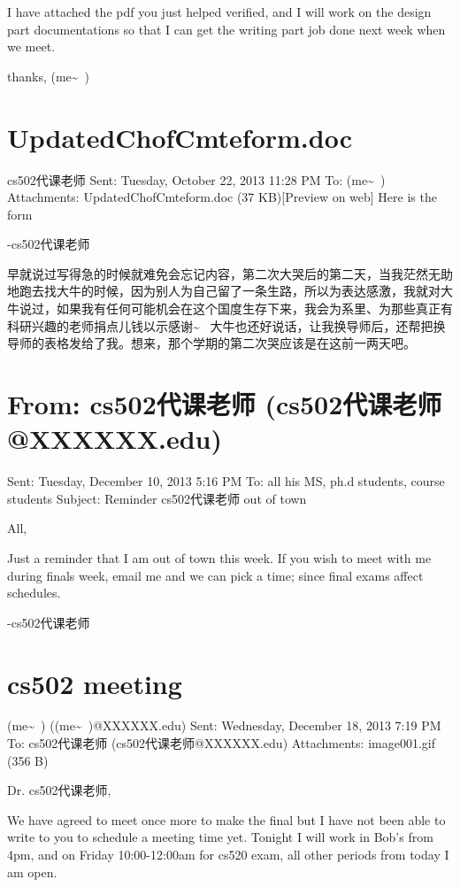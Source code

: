 \documentclass[12pt]{book}
\begin{document}
I have attached the pdf you just helped verified, and I will work on the design part documentations so that I  can get the writing part job done next week when we meet. 

thanks,
(me\textasciitilde{}~)


\section{UpdatedChofCmteform.doc}
\label{sec-33-2}
cs502代课老师
Sent:         Tuesday, October 22, 2013 11:28 PM
To:        
 (me\textasciitilde{}~)
Attachments:        
UpdatedChofCmteform.doc‎ (37 KB‎)[Preview on web]
Here is the form

-cs502代课老师

早就说过写得急的时候就难免会忘记内容，第二次大哭后的第二天，当我茫然无助地跑去找大牛的时候，因为别人为自己留了一条生路，所以为表达感激，我就对大牛说过，如果我有任何可能机会在这个国度生存下来，我会为系里、为那些真正有科研兴趣的老师捐点儿钱以示感谢\textasciitilde{}~ 大牛也还好说话，让我换导师后，还帮把换导师的表格发给了我。想来，那个学期的第二次哭应该是在这前一两天吧。


\section{From: cs502代课老师 (cs502代课老师@XXXXXX.edu)}
\label{sec-33-3}
Sent: Tuesday, December 10, 2013 5:16 PM
To: all his MS, ph.d students, course students
Subject: Reminder cs502代课老师 out of town

All,

Just a reminder that I am out of town this week. If you wish to meet with me during finals week, email me and we can pick a time; since final exams affect schedules.

-cs502代课老师


\section{cs502 meeting}
\label{sec-33-4}
 (me\textasciitilde{}~) ((me\textasciitilde{}~)@XXXXXX.edu)
Sent:         Wednesday, December 18, 2013 7:19 PM
To:        
cs502代课老师 (cs502代课老师@XXXXXX.edu)
Attachments:        
image001.gif‎ (356 B‎)

Dr. cs502代课老师, 

We have agreed to meet once more to make the final but I have not been able to write to you to schedule a meeting time yet. Tonight I will work in Bob's from 4pm, and on Friday 10:00-12:00am for cs520 exam, all other periods from today I am open. 
\end{document}
